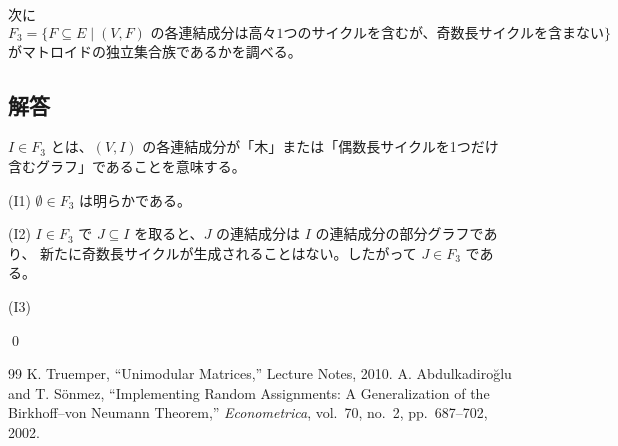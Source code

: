 \documentclass[a4paper]{ltjsarticle}
\begin{document}
次に
\[
F_3 = \{ F \subseteq E \mid (V,F) \text{ の各連結成分は高々1つのサイクルを含むが、奇数長サイクルを含まない} \}
\]
がマトロイドの独立集合族であるかを調べる。

\subsection*{解答}
$I \in F_3$ とは、$(V,I)$ の各連結成分が「木」または「偶数長サイクルを1つだけ含むグラフ」であることを意味する。

(I1)
$\emptyset \in F_3$ は明らかである。

(I2)
$I \in F_3$ で $J \subseteq I$ を取ると、$J$ の連結成分は $I$ の連結成分の部分グラフであり、
新たに奇数長サイクルが生成されることはない。したがって $J \in F_3$ である。

(I3)


\qed

\begin{thebibliography}{99}
K. Truemper,
``Unimodular Matrices,'' Lecture Notes, 2010.
A. Abdulkadiroğlu and T. Sönmez,
``Implementing Random Assignments: A Generalization of the Birkhoff–von Neumann Theorem,''
\emph{Econometrica}, vol.~70, no.~2, pp.~687–702, 2002.
\end{thebibliography}
\end{document}

